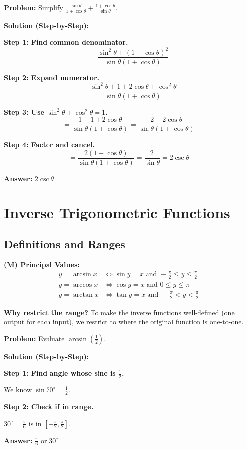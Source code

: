 \documentclass[12pt]{extarticle}
\begin{document}
\begin{examplebox}
\textbf{Problem:} Simplify $\frac{\sin\theta}{1 + \cos\theta} + \frac{1 + \cos\theta}{\sin\theta}$.

\textbf{Solution (Step-by-Step):}

\textbf{Step 1: Find common denominator.}
\[
= \frac{\sin^2\theta + (1 + \cos\theta)^2}{\sin\theta(1 + \cos\theta)}
\]

\textbf{Step 2: Expand numerator.}
\[
= \frac{\sin^2\theta + 1 + 2\cos\theta + \cos^2\theta}{\sin\theta(1 + \cos\theta)}
\]

\textbf{Step 3: Use $\sin^2\theta + \cos^2\theta = 1$.}
\[
= \frac{1 + 1 + 2\cos\theta}{\sin\theta(1 + \cos\theta)} = \frac{2 + 2\cos\theta}{\sin\theta(1 + \cos\theta)}
\]

\textbf{Step 4: Factor and cancel.}
\[
= \frac{2(1 + \cos\theta)}{\sin\theta(1 + \cos\theta)} = \frac{2}{\sin\theta} = 2\csc\theta
\]

\textbf{Answer:} $\boxed{2\csc\theta}$
\end{examplebox}

\section{Inverse Trigonometric Functions}

\subsection{Definitions and Ranges}

\begin{theorembox}
\textbf{(M) Principal Values:}
\begin{align*}
y = \arcsin x &\iff \sin y = x \text{ and } -\frac{\pi}{2} \le y \le \frac{\pi}{2} \\
y = \arccos x &\iff \cos y = x \text{ and } 0 \le y \le \pi \\
y = \arctan x &\iff \tan y = x \text{ and } -\frac{\pi}{2} < y < \frac{\pi}{2}
\end{align*}
\end{theorembox}

\begin{remarkbox}
\textbf{Why restrict the range?} To make the inverse functions well-defined (one output for each input), we restrict to where the original function is one-to-one.
\end{remarkbox}

\begin{examplebox}
\textbf{Problem:} Evaluate $\arcsin\left(\frac{1}{2}\right)$.

\textbf{Solution (Step-by-Step):}

\textbf{Step 1: Find angle whose sine is $\frac{1}{2}$.}

We know $\sin 30^\circ = \frac{1}{2}$.

\textbf{Step 2: Check if in range.}

$30^\circ = \frac{\pi}{6}$ is in $\left[-\frac{\pi}{2}, \frac{\pi}{2}\right]$. \checkmark

\textbf{Answer:} $\boxed{\frac{\pi}{6} \text{ or } 30^\circ}$
\end{examplebox}
\end{document}
